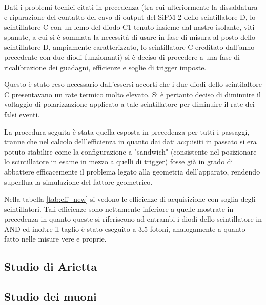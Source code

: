 Dati i problemi tecnici citati in precedenza (tra cui ulteriormente la dissaldatura e riparazione del contatto del cavo di output del SiPM 2 dello scintillatore D, lo scintillatore C con un lemo del diodo C1 tenuto insieme dal nastro isolante, viti spanate, a cui si \`e sommata la necessit\`a di usare in fase di misura al posto dello scintillatore D, ampiamente caratterizzato, lo scintillatore C ereditato dall'anno precedente con due diodi funzionanti) si \`e deciso di procedere a una fase di ricalibrazione dei guadagni, efficienze e soglie di trigger imposte.

Questo \`e stato reso necessario dall'essersi accorti che i due diodi dello scintilaltore C presentavano un rate termico molto elevato. Si \`e pertanto deciso di diminuire il voltaggio di polarizzazione applicato a tale scintillatore per diminuire il rate dei falsi eventi.

La procedura seguita \`e stata quella esposta in precedenza per tutti i passaggi, tranne che nel calcolo dell'efficienza in quanto dai dati acquisiti in passato si era  potuto stabilire come la configurazione a "sandwich" (consistente nel posizionare lo scintillatore in esame in mezzo a quelli di trigger) fosse gi\`a in grado di abbattere efficacemente il problema legato alla geometria dell'apparato, rendendo superflua la simulazione del fattore geometrico.


Nella tabella \ref{tab:eff_new} si vedono le efficienze di acquisizione con soglia degli scintillatori. Tali efficienze sono nettamente inferiore a quelle mostrate in precedenza in quanto queste si riferiscono ad entrambi i diodi dello scintillatore in AND ed inoltre il taglio \`e stato eseguito a 3.5 fotoni, analogamente a quanto fatto nelle misure vere e proprie.


\subsection{Studio di Arietta}


\subsection{Studio dei muoni}

